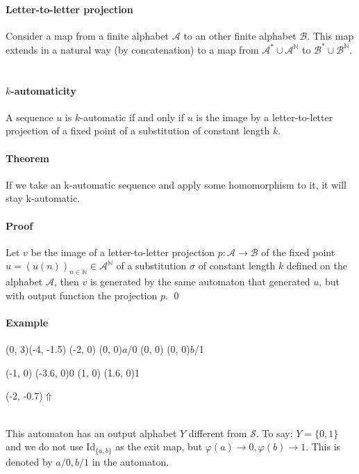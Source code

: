 \documentclass{article}
\begin{document}
\paragraph{Letter-to-letter projection} Consider a map from a finite alphabet
$\mathcal{A}$ to an other finite alphabet $\mathcal{B}$. This map extends in
a natural way (by concatenation) to a map from
$\mathcal{A}^* \cup \mathcal{A}^\mathbb{N}$ to
$\mathcal{B}^* \cup \mathcal{B}^\mathbb{N}$.\\
\\
\paragraph{$k$-automaticity} A sequence $u$ is $k$-automatic if and only if
$u$ is the image by a letter-to-letter projection of a fixed point of a
substitution of constant length $k$.

\paragraph{Theorem} If we take an k-automatic sequence and apply some
homomorphism to it, it will stay k-automatic.

\paragraph{Proof} Let $v$ be the image of a letter-to-letter
projection $p: \mathcal{A} \rightarrow \mathcal{B}$ of the fixed point
$u = (u(n))_{n \in \mathbb{N}} \in \mathcal{A}^\mathbb{N}$ of a substitution
$\sigma$ of constant length $k$ defined on the alphabet $\mathcal{A}$, then
$v$ is generated by the same automaton that generated $u$, but with output
function the projection $p$. \qed

\paragraph{Example\\}
\begin{graph}(0, 3)(-4, -1.5)
  (-2, 0) (0, 0){$a$/0}
  (0, 0)  (0, 0){$b$/1}

  (-1, 0) \freetext(-3.6, 0){0}
   
   
  (1, 0) \freetext(1.6, 0){1}

  \freetext(-2, -0.7){$\Uparrow$}
\end{graph}\\
This automaton has an output alphabet $Y$ different from $\mathcal{S}$. To
say: $Y = \{0, 1\}$ and we do not use Id$_{\{a, b\}}$ as the exit map, but
$\varphi(a) \rightarrow 0, \varphi(b) \rightarrow 1$. This is denoted by
$a/0, b/1$ in the automaton.
\end{document}
